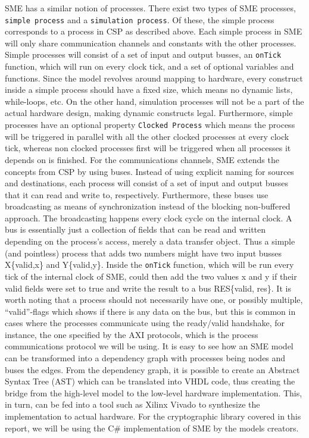 \documentclass[a4paper, openany]{memoir}
\begin{document}
\begin{abstact}
SME has a similar notion of processes. There exist two types of SME processes, \texttt{simple process} and a \texttt{simulation process}. Of these, the simple process corresponds to a process in CSP as described above. Each simple process in SME will only share communication channels and constants with the other processes. Simple processes will consist of a set of input and output busses, an \texttt{onTick} function, which will run on every clock tick, and a set of optional variables and functions. Since the model revolves around mapping to hardware, every construct inside a simple process should have a fixed size, which means no dynamic lists, while-loops, etc. On the other hand, simulation processes will not be a part of the actual hardware design, making dynamic constructs legal. Furthermore, simple processes have an optional property \texttt{Clocked Process} which means the process will be triggered in parallel with all the other clocked processes at every clock tick, whereas non clocked processes first will be triggered when all processes it depends on is finished.
For the communications channels, SME extends the concepts from CSP by using buses. Instead of using explicit naming for sources and destinations, each process will consist of a set of input and output busses that it can read and write to, respectively. Furthermore, these buses use broadcasting as means of synchronization instead of the blocking non-buffered approach.  The broadcasting happens every clock cycle on the internal clock.
A bus is essentially just a collection of fields that can be read and written depending on the process's access, merely a data transfer object. Thus a simple (and pointless) process that adds two numbers might have two input busses X\{valid,x\} and Y\{valid,y\}. Inside the \texttt{onTick} function, which will be run every tick of the internal clock of SME, could then add the two values x and y if their valid fields were set to true and write the result to a bus RES\{valid, res\}. It is worth noting that a process should not necessarily have one, or possibly multiple, ``valid''-flags which shows if there is any data on the bus, but this is common in cases where the processes communicate using the ready/valid handshake, for instance, the one specified by the AXI protocols, which is the process communications protocol we will be using. It is easy to see how an SME model can be transformed into a dependency graph with processes being nodes and buses the edges. From the dependency graph, it is possible to create an Abstract Syntax Tree (AST) which can be translated into VHDL code\cite{sme}, thus creating the bridge from the high-level model to the low-level hardware implementation. This, in turn, can be fed into a tool such as Xilinx Vivado to synthesize the implementation to actual hardware. For the cryptographic library covered in this report, we will be using the C\# implementation of SME by the models creators\cite{sme}.

\end{abstact}
\end{document}
